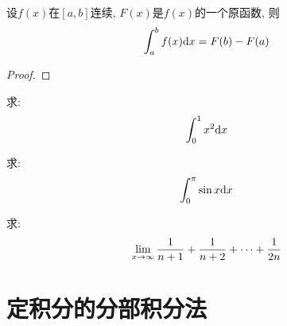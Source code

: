 \begin{solution}
    
\end{solution}

\begin{theorem}[微积分基本定理]
    设$f(x)$在$[a, b]$连续, $F(x)$是$f(x)$的一个原函数, 则
    \begin{equation*}
        \int_a^b f(x)\mathrm{d} x = F(b) - F(a)
    \end{equation*}
\end{theorem}
\begin{proof}
    
\end{proof}

\begin{example}
    求:
    \begin{equation*}
        \int_{0}^{1}x^2 \mathrm{d} x
    \end{equation*}
\end{example}
\begin{solution}
    
\end{solution}

\begin{example}
    求:
    \begin{equation*}
        \int_0^\pi \sin x \mathrm{d} x
    \end{equation*}
\end{example}
\begin{solution}
    
\end{solution}

\begin{example}
    求:
    \begin{equation*}
        \def\tmp{\frac{1}{n+1}+\frac{1}{n+2}+\cdots+\frac{1}{2n}}
        \funclim{x}{\infty}{\tmp}
    \end{equation*}
\end{example}
\begin{solution}
    
\end{solution}

\section{定积分的分部积分法}